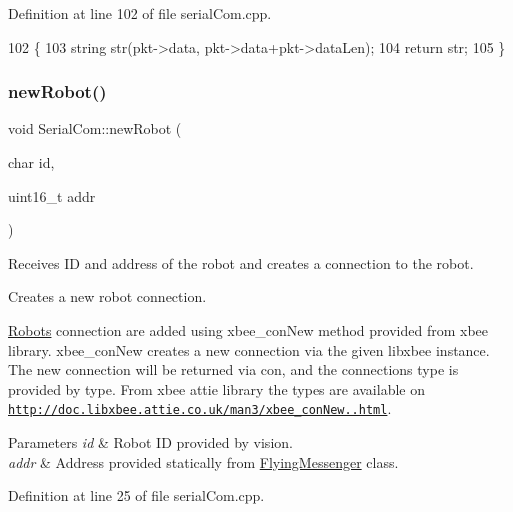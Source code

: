 Definition at line 102 of file serial\+Com.\+cpp.


\begin{DoxyCode}
102                                                 \{
103     \textcolor{keywordtype}{string} str(pkt->data, pkt->data+pkt->dataLen);
104     \textcolor{keywordflow}{return} str;
105 \}
\end{DoxyCode}
\mbox{\label{class_serial_com_a49c37690ef5f8c76a4c49f568dc1bb7f}} 
\subsubsection{\texorpdfstring{new\+Robot()}{newRobot()}}
{\footnotesize\ttfamily void Serial\+Com\+::new\+Robot (\begin{DoxyParamCaption}\item[{char}]{id,  }\item[{uint16\+\_\+t}]{addr }\end{DoxyParamCaption})}



Receives ID and address of the robot and creates a connection to the robot. 

Creates a new robot connection.

\hyperlink{class_robots}{Robots} connection are added using xbee\+\_\+con\+New method provided from xbee library. xbee\+\_\+con\+New creates a new connection via the given libxbee instance. The new connection will be returned via \textquotesingle{}con\textquotesingle{}, and the connection\textquotesingle{}s type is provided by type. From xbee attie library the types are available on \href{http://doc.libxbee.attie.co.uk/man3/xbee_conNew.3.html}{\tt http\+://doc.\+libxbee.\+attie.\+co.\+uk/man3/xbee\+\_\+con\+New..\+html}.


\begin{DoxyParams}{Parameters}
{\em id} & Robot ID provided by vision. \\
\hline
{\em addr} & Address provided statically from \hyperlink{class_flying_messenger}{Flying\+Messenger} class. \\
\hline
\end{DoxyParams}


Definition at line 25 of file serial\+Com.\+cpp.


